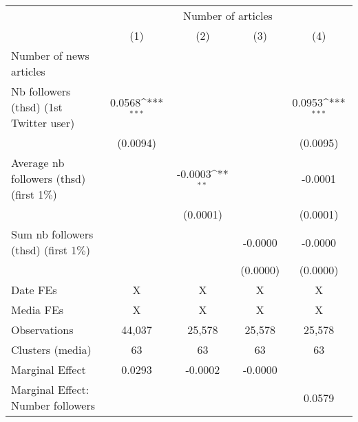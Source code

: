 {
\def\sym#1{\ifmmode^{#1}\else\(^{#1}\)\fi}
\begin{tabular}{l*{4}{c}}
\hline\hline
                    &\multicolumn{4}{c}{Number of articles}                                                 \\\cmidrule(lr){2-5}
                    &\multicolumn{1}{c}{(1)}         &\multicolumn{1}{c}{(2)}         &\multicolumn{1}{c}{(3)}         &\multicolumn{1}{c}{(4)}         \\
\hline
Number of news articles&                     &                     &                     &                     \\
Nb followers (thsd) (1st Twitter user)&      0.0568\sym{***}&                     &                     &      0.0953\sym{***}\\
                    &    (0.0094)         &                     &                     &    (0.0095)         \\
Average nb followers (thsd) (first 1$\%$)&                     &     -0.0003\sym{**} &                     &     -0.0001         \\
                    &                     &    (0.0001)         &                     &    (0.0001)         \\
Sum nb followers (thsd) (first 1$\%$)&                     &                     &     -0.0000         &     -0.0000         \\
                    &                     &                     &    (0.0000)         &    (0.0000)         \\
\hline
Date FEs            &           X         &           X         &           X         &           X         \\
Media FEs           &           X         &           X         &           X         &           X         \\
Observations        &      44,037         &      25,578         &      25,578         &      25,578         \\
Clusters (media)    &          63         &          63         &          63         &          63         \\
Marginal Effect     &      0.0293         &     -0.0002         &     -0.0000         &                     \\
Marginal Effect: Number followers&                     &                     &                     &      0.0579         \\
\hline\hline
\end{tabular}
}

